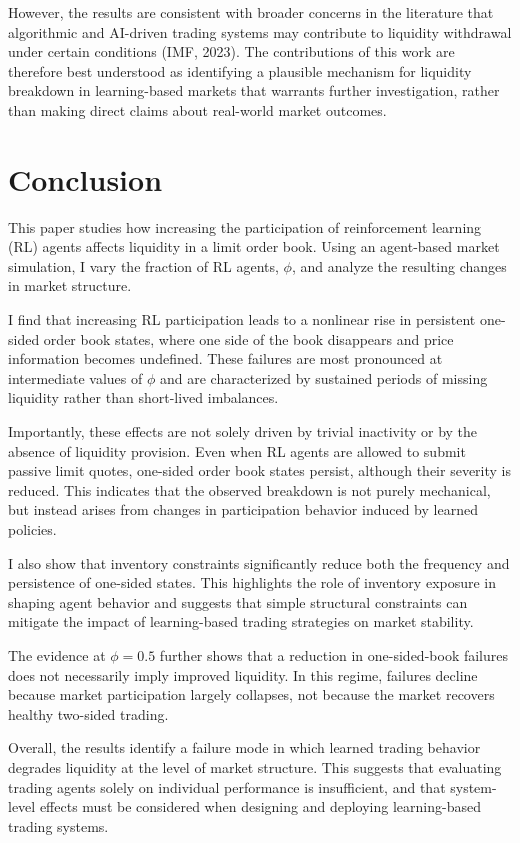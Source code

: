 \documentclass[sigconf]{acmart}
\begin{document}
However, the results are consistent with broader concerns in the literature that algorithmic and AI-driven trading systems may contribute to liquidity withdrawal under certain conditions (IMF, 2023). The contributions of this work are therefore best understood as identifying a plausible mechanism for liquidity breakdown in learning-based markets that warrants further investigation, rather than making direct claims about real-world market outcomes.

\section{Conclusion}

This paper studies how increasing the participation of reinforcement learning (RL) agents affects liquidity in a limit order book. Using an agent-based market simulation, I vary the fraction of RL agents, $\phi$, and analyze the resulting changes in market structure.

I find that increasing RL participation leads to a nonlinear rise in persistent one-sided order book states, where one side of the book disappears and price information becomes undefined. These failures are most pronounced at intermediate values of $\phi$ and are characterized by sustained periods of missing liquidity rather than short-lived imbalances.

Importantly, these effects are not solely driven by trivial inactivity or by the absence of liquidity provision. Even when RL agents are allowed to submit passive limit quotes, one-sided order book states persist, although their severity is reduced. This indicates that the observed breakdown is not purely mechanical, but instead arises from changes in participation behavior induced by learned policies.

I also show that inventory constraints significantly reduce both the frequency and persistence of one-sided states. This highlights the role of inventory exposure in shaping agent behavior and suggests that simple structural constraints can mitigate the impact of learning-based trading strategies on market stability.

The evidence at $\phi = 0.5$ further shows that a reduction in one-sided-book failures does not necessarily imply improved liquidity. In this regime, failures decline because market participation largely collapses, not because the market recovers healthy two-sided trading.

Overall, the results identify a failure mode in which learned trading behavior degrades liquidity at the level of market structure. This suggests that evaluating trading agents solely on individual performance is insufficient, and that system-level effects must be considered when designing and deploying learning-based trading systems.
\end{document}
